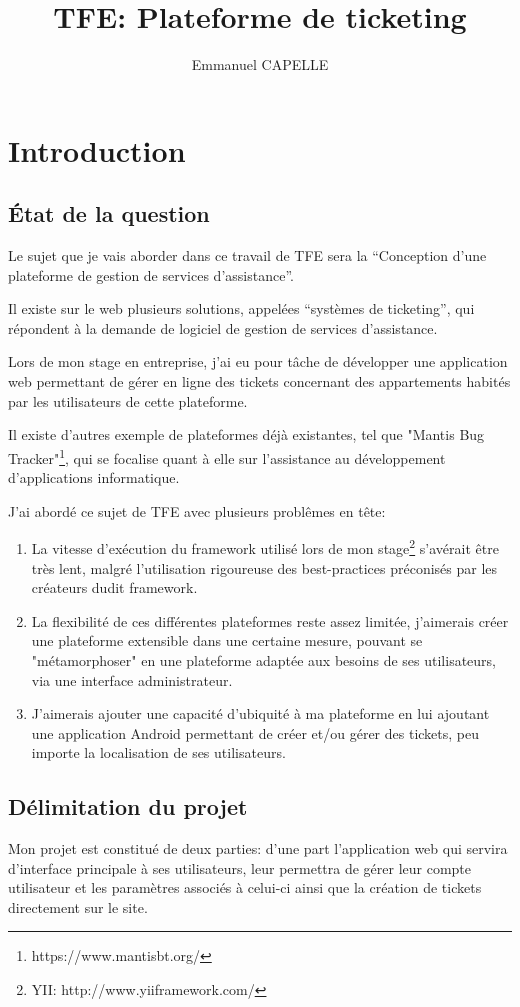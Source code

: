\documentclass[12pt,table,a4paper]{report}
\title{TFE: Plateforme de ticketing}
\author{Emmanuel CAPELLE}
\date{}
\begin{document}
\tableofcontents

\newpage

\chapter{Introduction}

\section{État de la question}
Le sujet que je vais aborder dans ce travail de TFE sera la “Conception d’une plateforme de gestion de services d’assistance”.

Il existe sur le web plusieurs solutions, appelées “systèmes de ticketing”, qui répondent à la demande de logiciel de gestion de services d’assistance.

Lors de mon stage en entreprise, j’ai eu pour tâche de développer une application web permettant de gérer en ligne des tickets concernant des appartements habités par les utilisateurs de cette plateforme.

Il existe d’autres exemple de plateformes déjà existantes, tel que "Mantis Bug Tracker"\footnote{https://www.mantisbt.org/}, qui se focalise quant à elle sur l’assistance au développement d’applications informatique.

J’ai abordé ce sujet de TFE avec plusieurs problêmes en tête:
\begin{enumerate}
\item{La vitesse d’exécution du framework utilisé lors de mon stage\footnote{YII: http://www.yiiframework.com/} s’avérait être très lent, malgré l’utilisation rigoureuse des best-practices préconisés par les créateurs dudit framework.}
\item{La flexibilité de ces différentes plateformes reste assez limitée, j’aimerais créer une plateforme extensible dans une certaine mesure, pouvant se "métamorphoser" en une plateforme adaptée aux besoins de ses utilisateurs, via une interface administrateur.}
\item{J’aimerais ajouter une capacité d’ubiquité à ma plateforme en lui ajoutant une application Android permettant de créer et/ou gérer des tickets, peu importe la localisation de ses utilisateurs.}
\end{enumerate}


\section{Délimitation du projet}
Mon projet est constitué de deux parties: d'une part l'application web qui servira d'interface principale à ses utilisateurs, leur permettra de gérer leur compte utilisateur et les paramètres associés à celui-ci ainsi que la création de tickets directement sur le site.
\end{document}
